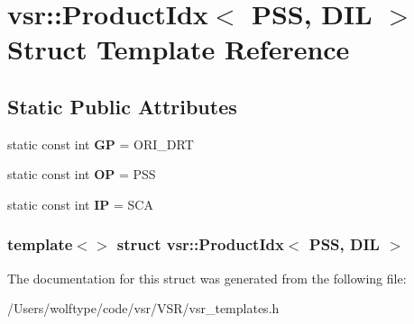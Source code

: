 \hypertarget{structvsr_1_1_product_idx_3_01_p_s_s_00_01_d_i_l_01_4}{\section{vsr\-:\-:Product\-Idx$<$ P\-S\-S, D\-I\-L $>$ Struct Template Reference}
\label{structvsr_1_1_product_idx_3_01_p_s_s_00_01_d_i_l_01_4}
}
\subsection*{Static Public Attributes}
\begin{DoxyCompactItemize}
\item 
\hypertarget{structvsr_1_1_product_idx_3_01_p_s_s_00_01_d_i_l_01_4_a4de5c4175ae535066e929aadb863c4d6}{static const int {\bfseries G\-P} = O\-R\-I\-\_\-\-D\-R\-T}\label{structvsr_1_1_product_idx_3_01_p_s_s_00_01_d_i_l_01_4_a4de5c4175ae535066e929aadb863c4d6}

\item 
\hypertarget{structvsr_1_1_product_idx_3_01_p_s_s_00_01_d_i_l_01_4_a00fcdbb73fa5324e1a7026907c210838}{static const int {\bfseries O\-P} = P\-S\-S}\label{structvsr_1_1_product_idx_3_01_p_s_s_00_01_d_i_l_01_4_a00fcdbb73fa5324e1a7026907c210838}

\item 
\hypertarget{structvsr_1_1_product_idx_3_01_p_s_s_00_01_d_i_l_01_4_a7b69918076f179ea0d2764d526b9f12f}{static const int {\bfseries I\-P} = S\-C\-A}\label{structvsr_1_1_product_idx_3_01_p_s_s_00_01_d_i_l_01_4_a7b69918076f179ea0d2764d526b9f12f}

\end{DoxyCompactItemize}
\subsubsection*{template$<$$>$ struct vsr\-::\-Product\-Idx$<$ P\-S\-S, D\-I\-L $>$}



The documentation for this struct was generated from the following file\-:\begin{DoxyCompactItemize}
\item 
/\-Users/wolftype/code/vsr/\-V\-S\-R/vsr\-\_\-templates.\-h\end{DoxyCompactItemize}
